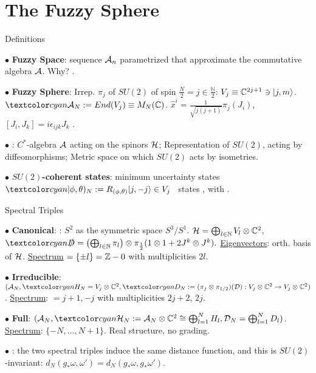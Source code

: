 \section{The Fuzzy Sphere}

\begin{frame}{Definitions} %
    
    $\bullet$ \textbf{Fuzzy Space}: %
    sequence $\mathcal A_n$ parametrized that approximate the commutative algebra $\mathcal A$. Why? .
    
    $\bullet$ \textbf{Fuzzy Sphere}: Irrep. $\pi_j$ of $SU(2)$ of spin $\frac{N}{2} = j \in \frac{\mathbb N}{2}$: $V_j \equiv \mathbb C^{2j+1} \ni |j, m\rangle$. $\lbtext{\acal_N}:= End(V_j) \equiv M_N(\CC)$. $\hat x^i = \frac{1}{\sqrt{j(j+1)}} \pi_{j}(J_i)$, $[J_i, J_k] = i \epsilon_{ijk} J_k$ \then {}.
    
    $\bullet$ :  $C^*$-algebra $\mathcal A$ acting on the spinors $\mathcal H$;  Representation of $SU(2)$, acting by diffeomorphisms;   Metric space on which $SU(2)$ acts by isometries.
    
    $\bullet$ \textbf{$SU(2)$-coherent states}: minimum uncertainty states $\lbtext{|\phi, \theta)_N} := R_{(\phi, \theta)}|j, -j\rangle \in V_j$ \iff\ states  , with .
    
\end{frame}


\begin{frame}{Spectral Triples} %
    
     $\bullet$ \textbf{Canonical}: : $S^2$ as the symmetric space $S^3/S^1$. $\mathcal H = \bigoplus_{l \in \mathbb N} V_l \otimes \mathbb C^2$, $\lbtext{\slashed D} = \left( \bigoplus_{l \in \NN} \pi_l \right) \otimes \pi_{\frac{1}{2}}(1\otimes 1 + 2 J^k \otimes J^k).$ \underline{Eigenvectors}: orth. basis of $\mathcal H$. \underline{Spectrum} $= \{\pm l\} = \mathbb Z - 0$ with multiplicities $2l$.
     
     $\bullet$ \textbf{Irreducible}: $(\acal_N, \lbtext{H_N} = V_j \otimes \CC^2, \lbtext{D_N} 
    := (\pi_j \otimes \pi_{1/2})(\mathcal D): V_j \otimes \CC^2 \to V_j \otimes \CC^2)$. \underline{Spectrum}: $= j+1, -j$ with multiplicities $2j+2$, $2j$. 
     
     $\bullet$ \textbf{Full}: $(\acal_N, \lbtext{\hcal_N} := \mathcal A_N \otimes \CC^2 \cong \bigoplus_{l =1}^N H_l, \mathcal D_N = \bigoplus_{l =1}^N D_l)$. \underline{Spectrum}: $\{-N, \dots, N+1\}$. Real structure, no grading.
     
     $\bullet$ \textbf{}: the two spectral triples induce the same distance function, and this is $SU(2)$-invariant: $d_N(g_* \omega, \omega') = d_N(g_* \omega, g_*\omega')$.
    
\end{frame}


